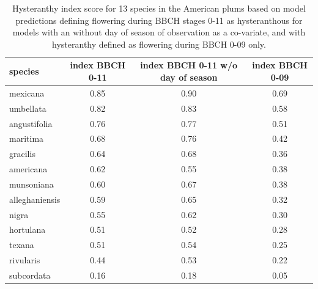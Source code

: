 \documentclass{article}[11pt]
\begin{document}
\begin{table}[ht]
\centering
\begin{tabular}{|lccc|}
  \hline
  species & index BBCH 0-11 & index BBCH 0-11 w/o day of season & index BBCH 0-09 \\ 
  \hline
 mexicana & 0.85 & 0.90 & 0.69 \\ 
  umbellata & 0.82 & 0.83 & 0.58 \\ 
 angustifolia & 0.76 & 0.77 & 0.51 \\ 
  maritima & 0.68 & 0.76 & 0.42 \\ 
 gracilis & 0.64 & 0.68 & 0.36 \\ 
  americana & 0.62 & 0.55 & 0.38 \\ 
  munsoniana & 0.60 & 0.67 & 0.38 \\ 
 alleghaniensis & 0.59 & 0.65 & 0.32 \\ 
  nigra & 0.55 & 0.62 & 0.30 \\ 
   hortulana & 0.51 & 0.52 & 0.28 \\ 
   texana & 0.51 & 0.54 & 0.25 \\ 
   rivularis & 0.44 & 0.53 & 0.22 \\ 
   subcordata & 0.16 & 0.18 & 0.05 \\ 
   \hline
\end{tabular}
\caption{Hysteranthy index score for 13 species in the American plums based on model predictions defining flowering during BBCH stages 0-11 as hysteranthous for models with an without day of season of observation as a co-variate, and with hysteranthy defined as flowering during BBCH 0-09 only. }
\label{tab:mod1comps}
\end{table}
\end{document}
